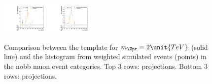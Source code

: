 \begin{figure}[htpb]
  \includegraphics[width=0.2\textwidth]{fig/analysisAppendix/templateVsReco_ZprToWW2000_r0_MJ_mu_HP_vbf_HDy.pdf}
  \includegraphics[width=0.2\textwidth]{fig/analysisAppendix/templateVsReco_ZprToWW2000_r0_MJ_mu_LP_vbf_HDy.pdf}\\
  \caption{
    Comparison between the \DY\ZprtoWW template for $m_{\Zpr}=2\unit{TeV}$ (solid line) and the histogram from weighted simulated events (points) in the nobb muon event categories.
    Top 3 rows: \MVV projections.
    Bottom 3 rows: \MJ projections.
  }
  \label{fig:1dtemplateVsReco_ZprToWW2000}
\end{figure}

